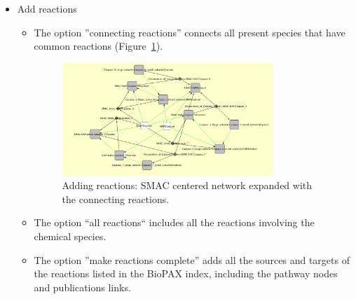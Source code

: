 \begin{itemize}

\item Add reactions
\begin{itemize}
\item The option ''connecting reactions'' connects all present species that have common reactions (Figure~\ref{Standard_Query_All_connecting_reactions}).

\begin{figure}
\centering
\includegraphics[width=0.8\textwidth]{graphics/ebo_smac_add_reactions}
\caption{Adding reactions: SMAC centered network expanded with the connecting reactions.}
\label{Standard_Query_All_connecting_reactions}
\end{figure}

\item The option ``all reactions`` includes all the reactions involving the chemical species.


\item The option ''make reactions complete'' adds all the sources and targets of the
reactions listed in the BioPAX index, including the pathway nodes and publications links.



\end{itemize}
\end{itemize}
